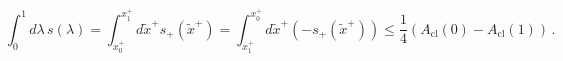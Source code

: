 \begin{equation}
\int_0^1 d\lambda\, s(\lambda) = \int_{x_0^+}^{x_1^+} d\tilde{x}^+
s_+(\tilde{x}^+) = \int_{x_1^+}^{x_0^+} d\tilde{x}^+ \left( 
-s_+(\tilde{x}^+) \right)
\leq \frac{1}{4} \left(
A_{\text{cl}}(0) - A_{\text{cl}}(1) \right) \, .
\end{equation}

